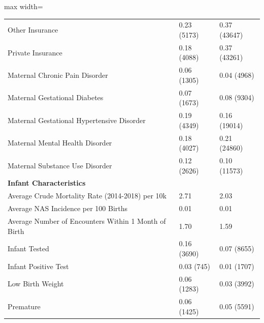 \begin{table}[ht]
\begin{adjustbox}{max width=\textwidth}
\begin{tabular}{lll}
\hspace{1em}Other Insurance & 0.23 (5173) & 0.37 (43647) \\
\hspace{1em}Private Insurance & 0.18 (4088) & 0.37 (43261) \\
\hspace{1em}Maternal Chronic Pain Disorder & 0.06 (1305) & 0.04 (4968) \\
\hspace{1em}Maternal Gestational Diabetes & 0.07 (1673) & 0.08 (9304) \\
\hspace{1em}Maternal Gestational Hypertensive Disorder & 0.19 (4349) & 0.16 (19014) \\
\hspace{1em}Maternal Mental Health Disorder & 0.18 (4027) & 0.21 (24860) \\
\hspace{1em}Maternal Substance Use Disorder & 0.12 (2626) & 0.10 (11573) \\
\multicolumn{3}{l}{\textbf{Infant Characteristics}} \\
\hspace{1em}Average Crude Mortality Rate (2014-2018) per 10k & 2.71  & 2.03 \\
\hspace{1em}Average NAS Incidence per 100 Births & 0.01 & 0.01 \\
\hspace{1em}Average Number of Encounters Within 1 Month of Birth & 1.70  & 1.59  \\
\hspace{1em}Infant Tested & 0.16 (3690) & 0.07 (8655) \\
\hspace{1em}Infant Positive Test & 0.03 (745) & 0.01 (1707) \\
\hspace{1em}Low Birth Weight & 0.06 (1283) & 0.03 (3992) \\
\hspace{1em}Premature & 0.06 (1425) & 0.05 (5591) \\
\bottomrule
\end{tabular}
\end{adjustbox}
\end{table}

